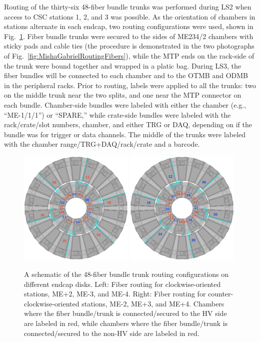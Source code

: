 Routing of the thirty-six 48-fiber bundle trunks was performed during LS2 when access to CSC stations 1, 2, and 3 was possible. As the orientation of chambers in stations alternate in each endcap, two routing configurations were used, shown in Fig.~\ref{fig:fiberrouting}. Fiber bundle trunks were secured to the sides of ME234/2 chambers with sticky pads and cable ties (the procedure is demonstrated in the two photographs of Fig.~\ref{fig:MishaGabrielRoutingFibers}), while the MTP ends on the rack-side of the trunk were bound together and wrapped in a platic bag. During LS3, the fiber bundles will be connected to each chamber and to the OTMB and ODMB in the peripheral racks. Prior to routing, labels were applied to all the trunks: two on the middle trunk near the two splits, and one near the MTP connector on each bundle. Chamber-side bundles were labeled with either the chamber (e.g., ``ME-1/1/1'') or ``SPARE,'' while crate-side bundles were labeled with the rack/crate/slot numbers, chamber, and either TRG or DAQ, depending on if the bundle was for trigger or data channels. The middle of the trunks were labeled with the chamber range/TRG+DAQ/rack/crate and a barcode.

\begin{figure}[H]
    \centering
    \includegraphics[width=0.49\textwidth]{Images/Phase2Upgrades/OpticalFibers/FiberRouting1.png}
    \includegraphics[width=0.49\textwidth]{Images/Phase2Upgrades/OpticalFibers/FiberRouting2.png}
    \caption{A schematic of the 48-fiber bundle trunk routing configurations on different endcap disks. Left: Fiber routing for clockwise-oriented stations, ME+2, ME-3, and ME-4. Right: Fiber routing for counter-clockwise-oriented stations, ME-2, ME+3, and ME+4. Chambers where the fiber bundle/trunk is connected/secured to the HV side are labeled in red, while chambers where the fiber bundle/trunk is connected/secured to the non-HV side are labeled in red.}
    \label{fig:fiberrouting}
\end{figure}

